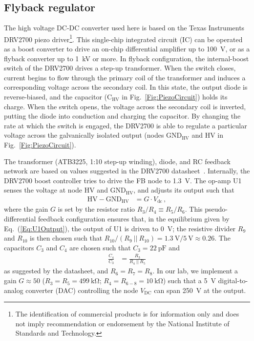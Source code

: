 \documentclass[aip,rsi,preprint,graphicx]{revtex4-1} %
\begin{document}
\subsection{Flyback regulator}
\label{Sec:DRV2700}

The high voltage DC-DC converter used here is based on the Texas Instruments DRV2700 piezo driver\footnote{The identification of commercial products is for information only and does not imply recommendation or endorsement by the National Institute of Standards and Technology.}.
This single-chip integrated circuit (IC) can be operated as a boost converter to drive an on-chip differential amplifier up to \SI{100}{\volt}, or as a flyback converter up to \SI{1}{\kilo\volt} or more.
In flyback configuration, the internal-boost switch of the DRV2700 drives a step-up transformer.
When the switch closes, current begins to flow through the primary coil of the transformer and induces a corresponding voltage across the secondary coil.
In this state, the output diode is reverse-biased, and the capacitor ($\text{C}_{\text{HV}}$ in Fig.~\ref{Fig:PiezoCircuit}) holds its charge.
When the switch opens, the voltage across the secondary coil is inverted, putting the diode into conduction and charging the capacitor.
By changing the rate at which the switch is engaged, the DRV2700 is able to regulate a particular voltage across the galvanically isolated output (nodes $\text{GND}_\text{HV}$ and HV in Fig.~\ref{Fig:PiezoCircuit}).

The transformer (ATB3225, 1:10 step-up winding), diode, and RC feedback network are based on values suggested in the DRV2700 datasheet~\cite{DRV2700Datasheet,DRV2700EVMUserGuide}.
Internally, the DRV2700 boost controller tries to drive the FB node to \SI{1.3}{\volt}.
The op-amp U1 senses the voltage at node HV and $\text{GND}_\text{HV}$, and adjusts its output such that
\begin{align}
\label{Eq:U1Output}
\text{HV} - \text{GND}_{\text{HV}} &= G\cdot V_{\text{dc}}\,,
\end{align}
where the gain $G$ is set by the resistor ratio $R_3/R_4 \equiv R_5/R_6$.
This pseudo-differential feedback configuration ensures that, in the equilibrium given by Eq.~(\ref{Eq:U1Output}), the output of U1 is driven to \SI{0}{\volt}; the resistive divider $R_9$ and $R_{10}$ is then chosen such that $R_{10}/(R_9~||~R_{10}) = \SI{1.3}{\volt}/\SI{5}{\volt} \approx \num{0.26}$.
The capacitors $C_3$ and $C_4$ are chosen such that $C_3 = \SI{22}{\pico\farad}$ and
\begin{align}
\frac{C_4}{C_3} &= \frac{R_3}{R_4~||~R_5}
\end{align}
as suggested by the datasheet, and $R_6 = R_7 = R_8$.
In our lab, we implement a gain $G\approx 50$ ($R_3 = R_5 = \SI{499}{\kilo\ohm}$; $R_4 = R_{6-8} = \SI{10}{\kilo\ohm}$) such that a \SI{5}{\volt} digital-to-analog converter (DAC) controlling the node $V_\text{DC}$ can span \SI{250}{\volt} at the output.
\end{document}
